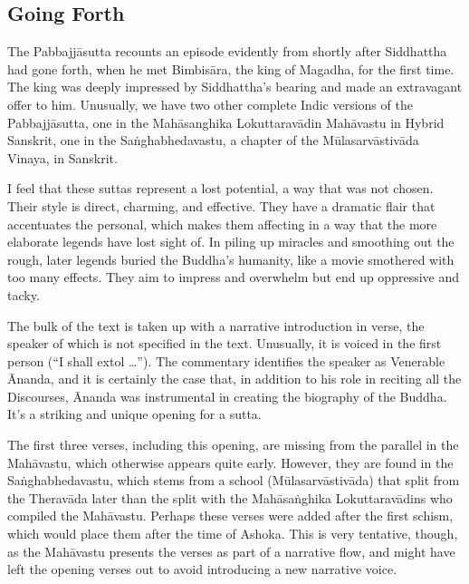 \documentclass[12pt,openany]{book}%
\begin{document}
\subsection*{Going Forth}

The \textsanskrit{Pabbajjāsutta} recounts an episode evidently from shortly after Siddhattha had gone forth, when he met \textsanskrit{Bimbisāra}, the king of Magadha, for the first time. The king was deeply impressed by Siddhattha’s bearing and made an extravagant offer to him. Unusually, we have two other complete Indic versions of the \textsanskrit{Pabbajjāsutta}, one in the \textsanskrit{Mahāsanghika} \textsanskrit{Lokuttaravādin} \textsanskrit{Mahāvastu} in Hybrid Sanskrit, one in the \textsanskrit{Saṅghabhedavastu}, a chapter of the \textsanskrit{Mūlasarvāstivāda} Vinaya, in Sanskrit.

I feel that these suttas represent a lost potential, a way that was not chosen. Their style is direct, charming, and effective. They have a dramatic flair that accentuates the personal, which makes them affecting in a way that the more elaborate legends have lost sight of. In piling up miracles and smoothing out the rough, later legends buried the Buddha’s humanity, like a movie smothered with too many effects. They aim to impress and overwhelm but end up oppressive and tacky.

The bulk of the text is taken up with a narrative introduction in verse, the speaker of which is not specified in the text. Unusually, it is voiced in the first person (“I shall extol …”). The commentary identifies the speaker as Venerable Ānanda, and it is certainly the case that, in addition to his role in reciting all the Discourses, Ānanda was instrumental in creating the biography of the Buddha. It’s a striking and unique opening for a sutta.

The first three verses, including this opening, are missing from the parallel in the \textsanskrit{Mahāvastu}, which otherwise appears quite early. However, they are found in the \textsanskrit{Saṅghabhedavastu}, which stems from a school (\textsanskrit{Mūlasarvāstivāda}) that split from the \textsanskrit{Theravāda} later than the split with the \textsanskrit{Mahāsaṅghika} \textsanskrit{Lokuttaravādins} who compiled the \textsanskrit{Mahāvastu}. Perhaps these verses were added after the first schism, which would place them after the time of Ashoka. This is very tentative, though, as the \textsanskrit{Mahāvastu} presents the verses as part of a narrative flow, and might have left the opening verses out to avoid introducing a new narrative voice.
\end{document}
